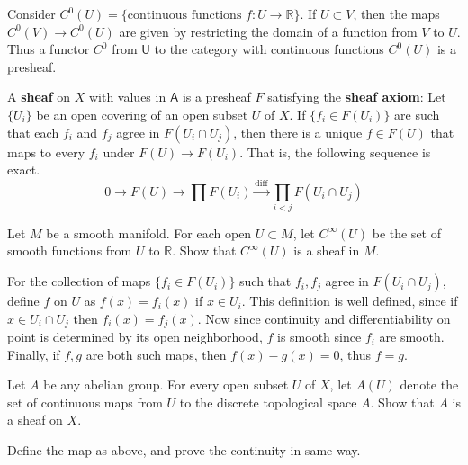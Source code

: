 \begin{exmp} Consider $C^0(U)=\{\textrm{continuous functions }f:U\rightarrow\mathbb{R}\}$. If $U\subset V$, then the maps $C^0(V)\rightarrow C^0(U)$ are given by restricting the domain of a function from $V$ to $U$. Thus a functor $C^0$ from $\mathsf{U}$ to the category with continuous functions $C^0(U)$ is a presheaf.
\end{exmp}

\begin{defn} A \textbf{sheaf} on $X$ with values in $\mathsf{A}$ is a presheaf $F$ satisfying the \textbf{sheaf axiom}: Let $\{U_i\}$ be an open covering of an open subset $U$ of $X$. If $\{f_i\in F(U_i)\}$ are such that each $f_i$ and $f_j$ agree in $F(U_i\cap U_j)$, then there is a unique $f\in F(U)$ that maps to every $f_i$ under $F(U)\rightarrow F(U_i)$. That is, the following sequence is exact.
\begin{equation}
0\rightarrow F(U)\rightarrow \prod F(U_i) \xrightarrow{\textrm{diff}} \prod_{i<j}F(U_i\cap U_j)
\end{equation}
\end{defn}

\begin{exer} Let $M$ be a smooth manifold. For each open $U\subset M$, let $C^\infty(U)$ be the set of smooth functions from $U$ to $\mathbb{R}$. Show that $C^\infty(U)$ is a sheaf in $M$.
\end{exer}
\begin{solution}
For the collection of maps $\{f_i\in F(U_i)\}$ such that $f_i,f_j$ agree in $F(U_i\cap U_j)$, define $f$ on $U$ as $f(x)=f_i(x)$ if $x\in U_i$. This definition is well defined, since if $x\in U_i\cap U_j$ then $f_i(x)=f_j(x)$. Now since continuity and differentiability on point is determined by its open neighborhood, $f$ is smooth since $f_i$ are smooth. Finally, if $f,g$ are both such maps, then $f(x)-g(x)=0$, thus $f=g$.
\end{solution}

\begin{exer} Let $A$ be any abelian group. For every open subset $U$ of $X$, let $A(U)$ denote the set of continuous maps from $U$ to the discrete topological space $A$. Show that $A$ is a sheaf on $X$.
\end{exer}

\begin{solution} Define the map as above, and prove the continuity in same way.
\end{solution}

